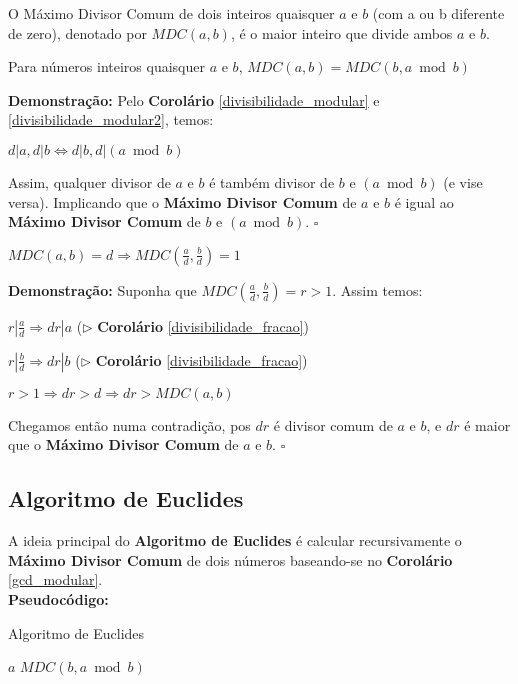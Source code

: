 \begin{definition}
O Máximo Divisor Comum de dois inteiros quaisquer $a$ e $b$ (com a ou b diferente de zero), denotado por $MDC(a,b)$, é o maior inteiro que divide ambos $a$ e $b$.
\end{definition}


\begin{corollary}\label{gcd_modular}
Para números inteiros quaisquer $a$ e $b$, $MDC(a,b) = MDC(b, a \bmod b)$
\end{corollary}
\textbf{Demonstração:}
Pelo \textbf{Corolário} \autoref{divisibilidade_modular} e \autoref{divisibilidade_modular2}, temos:

$d|a, d|b \Leftrightarrow d|b, d|(a \bmod b)$

Assim, qualquer divisor de $a$ e $b$ é também divisor de $b$ e $(a \bmod b)$ (e vise versa). Implicando que o \textbf{Máximo Divisor Comum} de $a$ e $b$
é igual ao \textbf{Máximo Divisor Comum} de $b$ e $(a \bmod b)$. $\square$



\begin{corollary}\label{divisibilidade_mdc}
$MDC(a,b) = d \Rightarrow MDC(\frac{a}{d}, \frac{b}{d}) = 1$
\end{corollary}
\textbf{Demonstração:}
Suponha que $MDC(\frac{a}{d}, \frac{b}{d}) = r > 1$. Assim temos:

$r|\frac{a}{d} \Rightarrow dr|a$ ($\triangleright$ \textbf{Corolário} \autoref{divisibilidade_fracao})

$r|\frac{b}{d} \Rightarrow dr|b$ ($\triangleright$ \textbf{Corolário} \autoref{divisibilidade_fracao})

$r > 1 \Rightarrow dr > d \Rightarrow dr > MDC(a,b)$

Chegamos então numa contradição, pos $dr$ é divisor comum de $a$ e $b$, e $dr$ é maior que o \textbf{Máximo Divisor Comum} de $a$ e $b$. $\square$

\subsection{Algoritmo de Euclides}
A ideia principal do \textbf{Algoritmo de Euclides} é calcular recursivamente o \textbf{Máximo Divisor Comum} de dois números baseando-se no 
\textbf{Corolário} \autoref{gcd_modular}.\\

\textbf{Pseudocódigo:}
\begin{algorithm}
\caption{Algoritmo de Euclides}\label{mdc}
\begin{algorithmic}[1]
\State \Return $a$
\Else
\State \Return $MDC(b, a \bmod b)$
\EndIf
\EndProcedure
\end{algorithmic}
\end{algorithm}




